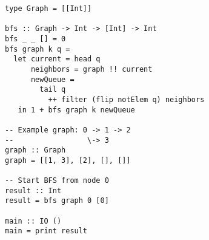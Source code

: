 
\begin{verbatim}
type Graph = [[Int]]

bfs :: Graph -> Int -> [Int] -> Int
bfs _ _ [] = 0
bfs graph k q =
  let current = head q
      neighbors = graph !! current
      newQueue =
        tail q
          ++ filter (flip notElem q) neighbors
   in 1 + bfs graph k newQueue

-- Example graph: 0 -> 1 -> 2
--                 \-> 3
graph :: Graph
graph = [[1, 3], [2], [], []]

-- Start BFS from node 0
result :: Int
result = bfs graph 0 [0]

main :: IO ()
main = print result
\end{verbatim}